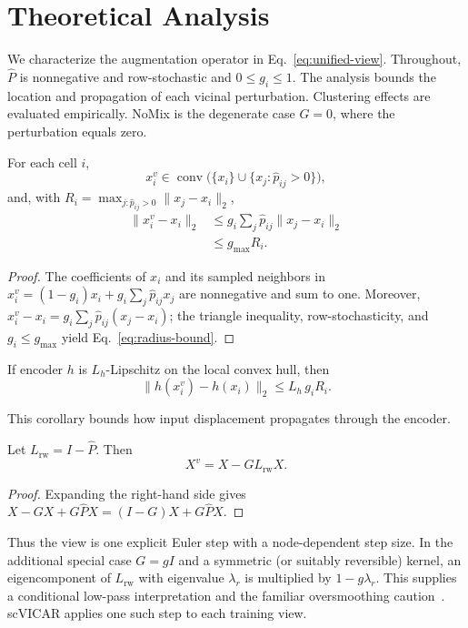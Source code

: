 \section{Theoretical Analysis}
\label{sec:theory}

We characterize the augmentation operator in Eq.~\eqref{eq:unified-view}.
Throughout, $\widehat P$ is nonnegative and row-stochastic and
$0\leq g_i\leq1$. The analysis bounds the location and propagation of each
vicinal perturbation. Clustering effects are evaluated empirically. NoMix is
the degenerate case $G=0$, where the perturbation equals zero.

\begin{proposition}
For each cell $i$,
\begin{equation}
 x_i^v\in\operatorname{conv}
 \bigl(\{x_i\}\cup\{x_j:\widehat p_{ij}>0\}\bigr),
\end{equation}
and, with $R_i=\max_{j:\widehat p_{ij}>0}\|x_j-x_i\|_2$,
\begin{equation}
\begin{aligned}
 \|x_i^v-x_i\|_2
 &\leq g_i\sum_j\widehat p_{ij}\|x_j-x_i\|_2\\
 &\leq g_{\max}R_i .
\end{aligned}
 \label{eq:radius-bound}
\end{equation}
\end{proposition}
\begin{proof}
The coefficients of $x_i$ and its sampled neighbors in
$x_i^v=(1-g_i)x_i+g_i\sum_j\widehat p_{ij}x_j$ are nonnegative and sum to one.
Moreover,
$x_i^v-x_i=g_i\sum_j\widehat p_{ij}(x_j-x_i)$; the triangle inequality,
row-stochasticity, and $g_i\leq g_{\max}$ yield
Eq.~\eqref{eq:radius-bound}.
\end{proof}

\begin{corollary}
If encoder $h$ is $L_h$-Lipschitz on the local convex hull, then
\begin{equation}
 \bigl\|h(x_i^v)-h(x_i)\bigr\|_2
 \leq L_h\,g_iR_i.
\end{equation}
\end{corollary}
This corollary bounds how input displacement propagates through the encoder.

\begin{proposition}
Let $L_{\mathrm{rw}}=I-\widehat P$.  Then
\begin{equation}
 X^v=X-GL_{\mathrm{rw}}X.
 \label{eq:diffusion}
\end{equation}
\end{proposition}
\begin{proof}
Expanding the right-hand side gives
$X-GX+G\widehat PX=(I-G)X+G\widehat PX$.
\end{proof}
Thus the view is one explicit Euler step with a node-dependent step size.  In
the additional special case $G=gI$ and a symmetric (or suitably reversible)
kernel, an eigencomponent of $L_{\mathrm{rw}}$ with eigenvalue $\lambda_r$ is
multiplied by $1-g\lambda_r$. This supplies a conditional low-pass
interpretation and the familiar oversmoothing caution~\cite{li2018laplacian}.
scVICAR applies one such step to each training view.

